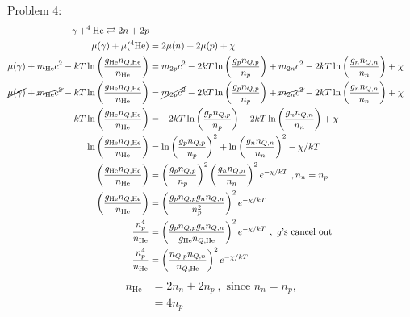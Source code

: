 \documentclass[10pt,letter,preprint]{aastex}
\newcommand{\rp}{\right)}
\newcommand{\lp}{\left(}
\begin{document}
\newpage
Problem 4:\\
\begin{align}
\gamma + ^{4}\textrm{He} \rightleftarrows 2n + 2p\\
\mu(\gamma) + \mu(^{4}\textrm{He}) &= 2\mu(n) + 2\mu(p) + \chi\\
\mu(\gamma) + m_{\textrm{He}}c^{2} - kT\ln \lp \frac{g_{\textrm{He}} n_{Q,\textrm{He}} }{n_{\textrm{He}}} \rp &= m_{2p}c^{2} - 2kT\ln \lp \frac{g_{p} n_{Q,p} }{n_{p}} \rp + m_{2n}c^{2} - 2kT\ln \lp \frac{g_{n} n_{Q,n} }{n_{n}} \rp+ \chi\\
\cancel{\mu(\gamma)} + \cancel{m_{\textrm{He}}c^{2}} - kT\ln \lp \frac{g_{\textrm{He}} n_{Q,\textrm{He}} }{n_{\textrm{He}}} \rp &= \cancel{m_{2p}c^{2}} - 2kT\ln \lp \frac{g_{p} n_{Q,p} }{n_{p}} \rp + \cancel{m_{2n}c^{2}} - 2kT\ln \lp \frac{g_{n} n_{Q,n} }{n_{n}} \rp+ \chi\\
- kT\ln \lp \frac{g_{\textrm{He}} n_{Q,\textrm{He}} }{n_{\textrm{He}}} \rp &= -2kT\ln \lp \frac{g_{p} n_{Q,p} }{n_{p}} \rp - 2kT\ln \lp \frac{g_{n} n_{Q,n} }{n_{n}} \rp+ \chi\\
\ln \lp \frac{g_{\textrm{He}} n_{Q,\textrm{He}} }{n_{\textrm{He}}} \rp &= \ln \lp \frac{g_{p} n_{Q,p} }{n_{p}} \rp^{2} +\ln \lp \frac{g_{n} n_{Q,n} }{n_{n}} \rp^{2} - \chi/kT\\
\lp \frac{g_{\textrm{He}} n_{Q,\textrm{He}} }{n_{\textrm{He}}} \rp &= \lp \frac{g_{p} n_{Q,p} }{n_{p}} \rp^{2} \lp \frac{g_{n} n_{Q,n} }{n_{n}} \rp^{2} e^{-\chi/kT}~,n_{n}=n_{p}\\
\lp \frac{g_{\textrm{He}} n_{Q,\textrm{He}} }{n_{\textrm{He}}} \rp &= \lp \frac{g_{p} n_{Q,p} g_{n} n_{Q,n} }{n_{p}^{2}}\rp^{2} e^{-\chi/kT}\\
\frac{n_{p}^{4}}{n_{\textrm{He}}} &=  \lp \frac{g_{p} n_{Q,p} g_{n} n_{Q,n} }{g_{\textrm{He}} n_{Q,\textrm{He}}}\rp^{2} e^{-\chi/kT}~,\textrm{ $g$'s cancel out}\\
\frac{n_{p}^{4}}{n_{\textrm{He}}} &=  \lp \frac{ n_{Q,p} n_{Q,n} }{ n_{Q,\textrm{He}}}\rp^{2} e^{-\chi/kT}
\end{align}
\begin{align}
n_{\textrm{He}} &= 2n_{n} + 2n_{p}~,\textrm{ since $n_{n}=n_{p}$,}\\
&= 4n_{p}
\end{align}
\end{document}
